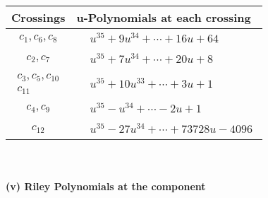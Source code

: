 \documentclass[1p]{elsarticle_modified}
\theoremstyle{definition}
\begin{document}
\begin{tabular}{m{50pt}|m{274pt}}
Crossings & \hspace{64pt}u-Polynomials at each crossing \\
\hline $$\begin{aligned}c_{1},c_{6},c_{8}\end{aligned}$$&$\begin{aligned}
&u^{35}+9 u^{34}+\cdots+16 u+64
\end{aligned}$\\
\hline $$\begin{aligned}c_{2},c_{7}\end{aligned}$$&$\begin{aligned}
&u^{35}+7 u^{34}+\cdots+20 u+8
\end{aligned}$\\
\hline $$\begin{aligned}c_{3},c_{5},c_{10}\\c_{11}\end{aligned}$$&$\begin{aligned}
&u^{35}+10 u^{33}+\cdots+3 u+1
\end{aligned}$\\
\hline $$\begin{aligned}c_{4},c_{9}\end{aligned}$$&$\begin{aligned}
&u^{35}- u^{34}+\cdots-2 u+1
\end{aligned}$\\
\hline $$\begin{aligned}c_{12}\end{aligned}$$&$\begin{aligned}
&u^{35}-27 u^{34}+\cdots+73728 u-4096
\end{aligned}$\\
\hline
\end{tabular}\\~\\
\newpage\renewcommand{\arraystretch}{1}
\flushleft \textbf{(v) Riley Polynomials at the component}\newline \\
\end{document}
